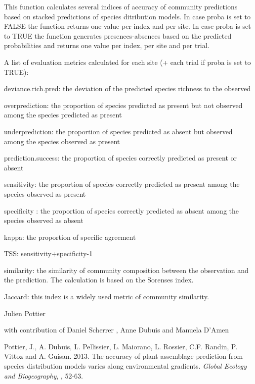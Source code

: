 \documentclass[a4paper]{book}
\begin{document}
%
\begin{Details}\relax
This function calculates several indices of accuracy of community predictions based on stacked predictions of species ditribution models. In case proba is set to FALSE the function returns one value per index and per site. In case proba is set to TRUE the function generates presences-absences based on the predicted probabilities and returns one value per index, per site and per trial.
\end{Details}
%
\begin{Value}
A list of evaluation metrics calculated for each site (+ each trial if proba is set to TRUE):

deviance.rich.pred: the deviation of the predicted species richness to the observed

overprediction: the proportion of species predicted as present but not observed among the species predicted as present

underprediction: the proportion of species predicted as absent but observed among the species observed as present

prediction.success: the proportion of species correctly predicted as present or absent

sensitivity: the proportion of species correctly predicted as present among the species observed as present

specificity : the proportion of species correctly predicted as absent among the species observed as absent

kappa: the proportion of specific agreement

TSS: sensitivity+specificity-1

similarity: the similarity of community composition between the observation and the prediction. The calculation is based on the Sorenses index.

Jaccard: this index is a widely used metric of community similarity.
\end{Value}
%
\begin{Author}\relax
Julien Pottier  

with contribution of Daniel Scherrer , Anne Dubuis  
and Manuela D'Amen 
\end{Author}
%
\begin{References}\relax
Pottier, J., A. Dubuis, L. Pellissier, L. Maiorano, L. Rossier, C.F. Randin, P. Vittoz and A. Guisan. 2013. The accuracy of plant assemblage prediction from species distribution models varies along environmental gradients. \emph{Global Ecology and Biogeography}, , 52-63.
\end{References}
\end{document}
